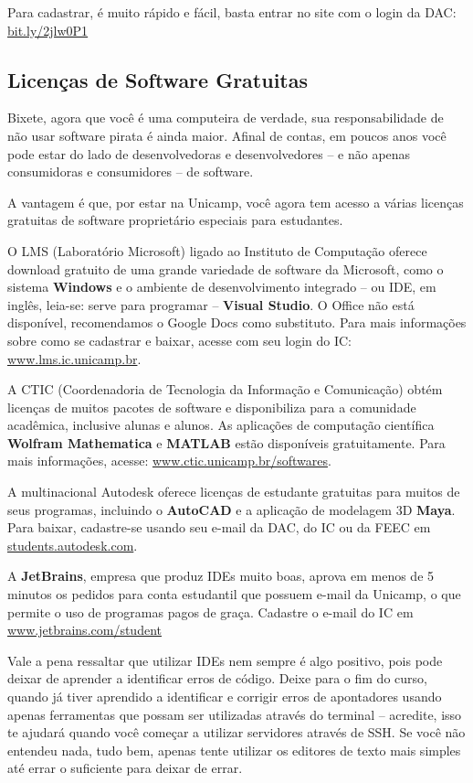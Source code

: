 Para cadastrar, é muito rápido e fácil, basta entrar no site com o login da
DAC: \url{bit.ly/2jlw0P1}

\subsection{Licenças de Software Gratuitas}

Bixete, agora que você é uma computeira de verdade, sua responsabilidade de não
usar software pirata é ainda maior. Afinal de contas, em poucos anos você pode
estar do lado de desenvolvedoras e desenvolvedores -- e não apenas consumidoras
e consumidores -- de software.

A vantagem é que, por estar na Unicamp, você agora tem acesso a várias licenças
gratuitas de software proprietário especiais para estudantes.

O LMS (Laboratório Microsoft) ligado ao Instituto de Computação oferece
download gratuito de uma grande variedade de software da Microsoft, como o
sistema \textbf{Windows} e o ambiente de desenvolvimento integrado -- ou IDE,
em inglês, leia-se: serve para programar -- \textbf{Visual Studio}. O Office
não está disponível, recomendamos o Google Docs como substituto. Para mais
informações sobre como se cadastrar e baixar, acesse com seu login do IC:
\url{www.lms.ic.unicamp.br}.

A CTIC (Coordenadoria de Tecnologia da Informação e Comunicação) obtém licenças
de muitos pacotes de software e disponibiliza para a comunidade acadêmica,
inclusive alunas e alunos. As aplicações de computação científica
\textbf{Wolfram Mathematica} e \textbf{MATLAB} estão disponíveis gratuitamente.
Para mais informações, acesse: \url{www.ctic.unicamp.br/softwares}.

A multinacional Autodesk oferece licenças de estudante gratuitas para muitos de
seus programas, incluindo o \textbf{AutoCAD} e a aplicação de modelagem 3D
\textbf{Maya}. Para baixar, cadastre-se usando seu e-mail da DAC, do IC ou da
FEEC em \url{students.autodesk.com}.

A \textbf{JetBrains}, empresa que produz IDEs muito boas, aprova em menos de 5
minutos os pedidos para conta estudantil que possuem e-mail da Unicamp, o que
permite o uso de programas pagos de graça. Cadastre o e-mail do IC em
\url{www.jetbrains.com/student}

Vale a pena ressaltar que utilizar IDEs nem sempre é algo positivo, pois pode
deixar de aprender a identificar erros de código. Deixe para o fim do curso,
quando já tiver aprendido a identificar e corrigir erros de apontadores usando
apenas ferramentas que possam ser utilizadas através do terminal -- acredite,
isso te ajudará quando você começar a utilizar servidores através de SSH.
Se você não entendeu nada, tudo bem, apenas tente utilizar os editores de texto
mais simples até errar o suficiente para deixar de errar.

